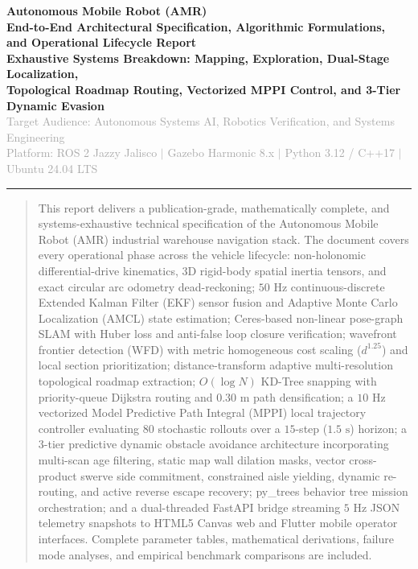 \documentclass[10pt,a4paper]{article}
\begin{document}
\begin{center}
    {\Huge \textcolor{primary}{\textbf{Autonomous Mobile Robot (AMR)}}}\\[0.20cm]
    {\LARGE \textcolor{secondary}{\textbf{End-to-End Architectural Specification, Algorithmic Formulations,}}}\\[0.10cm]
    {\LARGE \textcolor{secondary}{\textbf{and Operational Lifecycle Report}}}\\[0.30cm]
    {\large \textbf{Exhaustive Systems Breakdown: Mapping, Exploration, Dual-Stage Localization,}}\\[0.10cm]
    {\large \textbf{Topological Roadmap Routing, Vectorized MPPI Control, and 3-Tier Dynamic Evasion}}\\[0.20cm]
    {\normalsize \textcolor{darkgray}{Target Audience: Autonomous Systems AI, Robotics Verification, and Systems Engineering}}\\[0.15cm]
    {\footnotesize \textcolor{darkgray}{Platform: ROS 2 Jazzy Jalisco $|$ Gazebo Harmonic 8.x $|$ Python 3.12 / C++17 $|$ Ubuntu 24.04 LTS}}
\end{center}

\vspace{0.2cm}
\hrule height 1pt
\vspace{0.3cm}

\begin{abstract}
\noindent This report delivers a publication-grade, mathematically complete, and systems-exhaustive technical specification of the Autonomous Mobile Robot (AMR) industrial warehouse navigation stack. The document covers every operational phase across the vehicle lifecycle: non-holonomic differential-drive kinematics, 3D rigid-body spatial inertia tensors, and exact circular arc odometry dead-reckoning; $50\text{ Hz}$ continuous-discrete Extended Kalman Filter (EKF) sensor fusion and Adaptive Monte Carlo Localization (AMCL) state estimation; Ceres-based non-linear pose-graph SLAM with Huber loss and anti-false loop closure verification; wavefront frontier detection (WFD) with metric homogeneous cost scaling ($d^{1.25}$) and local section prioritization; distance-transform adaptive multi-resolution topological roadmap extraction; $O(\log N)$ KD-Tree snapping with priority-queue Dijkstra routing and $0.30\text{ m}$ path densification; a $10\text{ Hz}$ vectorized Model Predictive Path Integral (MPPI) local trajectory controller evaluating $80$ stochastic rollouts over a $15$-step ($1.5\text{ s}$) horizon; a 3-tier predictive dynamic obstacle avoidance architecture incorporating multi-scan age filtering, static map wall dilation masks, vector cross-product swerve side commitment, constrained aisle yielding, dynamic re-routing, and active reverse escape recovery; py\_trees behavior tree mission orchestration; and a dual-threaded FastAPI bridge streaming $5\text{ Hz}$ JSON telemetry snapshots to HTML5 Canvas web and Flutter mobile operator interfaces. Complete parameter tables, mathematical derivations, failure mode analyses, and empirical benchmark comparisons are included.
\end{abstract}
\end{document}

